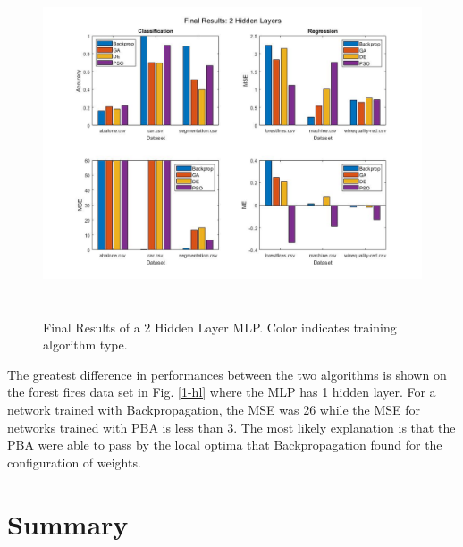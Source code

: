 \documentclass[twoside,11pt]{article}
\begin{document}
	\begin{figure}[h]
		\centering
		\includegraphics[height=4in]{FINAL_FIGS/2_hl.jpg}
		\caption{Final Results of a 2 Hidden Layer MLP. Color indicates training algorithm type.}
		\label{2-hl}
	\end{figure}

	The greatest difference in performances between the two algorithms is shown on the forest fires data set in Fig. \ref{1-hl} where the MLP has 1 hidden layer. 
	For a network trained with Backpropagation, the MSE was 26 while the MSE for networks trained with PBA is less than 3. 
	The most likely explanation is that the PBA were able to pass by the local optima that Backpropagation found for the configuration of weights.

\section{Summary}

\newpage


\end{document}
